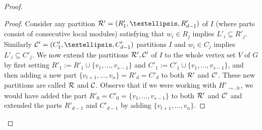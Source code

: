 \documentclass[11pt]{article}
\numberwithin{equation}{section}
\begin{document}
\begin{proof}
\begin{proof}
Consider any partition ${\cal R}'=(R'_1,\dots ,R'_{d-1})$ of $I$ (where parts consist of consecutive local modules) satisfying that $w_i\in R_j$ implies $L'_i \subseteq R'_j$. Similarly ${\cal C}'=(C'_1,\dots ,C'_{d-1})$ partitions $I$ and $w_i\in C_j$ implies $L'_i \subseteq C'_j$. We now extend the partitions ${\cal R}',{\cal C}'$ of $I$ to the whole vertex set $V$ of $G$ by first setting $R'_1:=R'_1\cup \{v_1,\dots ,v_{s-1}\}$ and $C'_1:=C'_1\cup \{v_1,\dots ,v_{s-1}\}$, and then adding a new part $\{v_{t+1},\dots ,v_{n}\}=R'_d=C'_d$ to both ${\cal R}'$ and ${\cal C}'$. These new partitions are called ${\cal R}$ and ${\cal C}$. Observe that if we were working with $H'_{\rightarrow,le}$, we would have added the part $R'_0=C'_0=\{v_1,\dots ,v_{s-1}\}$ to both ${\cal R}'$ and ${\cal C}'$ and extended the parts $R'_{d-1}$ and $C'_{d-1}$ by adding $\{v_{t+1},\dots ,v_{n}\}$. 



\end{proof}
\end{proof}
\end{document}
